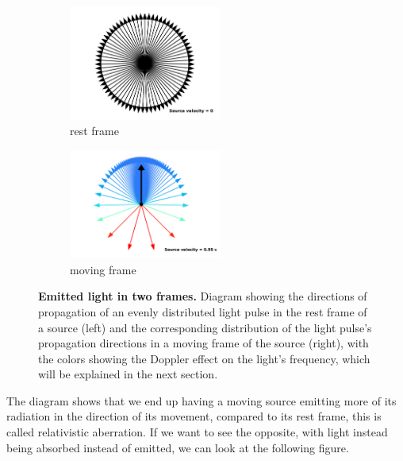 \begin{figure}[H]
	\begin{subfigure}{.49\textwidth}
		\centering
		\includegraphics[width = 5cm]{images/pdf/Aberrated_velocities_restframe.pdf}
		\caption{rest frame}
	\end{subfigure}
	\begin{subfigure}{.49\textwidth}
		\centering
		\includegraphics[width = 5cm]{images/pdf/Aberrated_velocities.pdf}
		\caption{moving frame}
	\end{subfigure}
	\caption{\textbf{Emitted light in two frames.} Diagram showing the directions of propagation of an evenly distributed light pulse in the rest frame of a source (left) and the corresponding distribution of the light pulse's propagation directions in a moving frame of the source (right), with the colors showing the Doppler effect on the light's frequency, which will be explained in the next section.}
	\label{fig: aberrated emitted light}
\end{figure}

The diagram shows that we end up having a moving source emitting more of its radiation in the direction of its movement, compared to its rest frame, this is called relativistic aberration.
If we want to see the opposite, with light instead being absorbed instead of emitted, we can look at the following figure.

